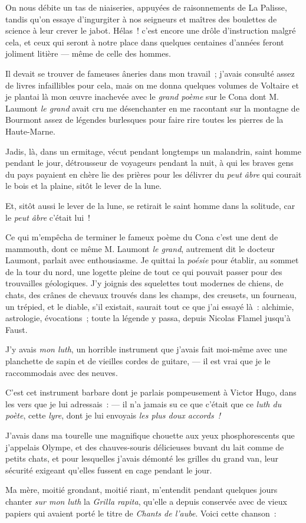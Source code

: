 \documentclass[french,twoside]{book} %
\begin{document}
On nous débite un tas de niaiseries, appuyées de raisonnements de La Palisse, tandis qu’on  essaye d’ingurgiter à nos seigneurs et maîtres des boulettes de science à leur crever le jabot. Hélas ! c’est encore une drôle d’instruction malgré cela, et ceux qui seront à notre place dans quelques centaines d’années feront joliment litière — même de celle des hommes.\par
Il devait se trouver de fameuses âneries dans mon travail ; j’avais consulté assez de livres infaillibles pour cela, mais on me donna quelques volumes de Voltaire et je plantai là mon œuvre inachevée avec le \emph{grand poème} sur le Cona dont M. Laumont \emph{le grand} avait cru me désenchanter en me racontant sur la montagne de Bourmont assez de légendes burlesques pour faire rire toutes les pierres de la Haute-Marne.\par
Jadis, là, dans un ermitage, vécut pendant longtemps un malandrin, saint homme pendant le jour, détrousseur de voyageurs pendant la nuit, à qui les braves gens du pays payaient en chère lie des prières pour les délivrer du \emph{peut âbre} qui courait le bois et la plaine, sitôt le lever de la lune.\par
Et, sitôt aussi le lever de la lune, se retirait le saint homme dans la solitude, car le \emph{peut âbre} c’était lui !\par
Ce qui m’empêcha de terminer le fameux poème du Cona c’est une dent de mammouth, dont ce  même M. Laumont \emph{le grand}, autrement dit le docteur Laumont, parlait avec enthousiasme. Je quittai la \emph{poésie} pour établir, au sommet de la tour du nord, une logette pleine de tout ce qui pouvait passer pour des trouvailles géologiques. J’y joignis des squelettes tout modernes de chiens, de chats, des crânes de chevaux trouvés dans les champs, des creusets, un fourneau, un trépied, et le diable, s’il existait, saurait tout ce que j’ai essayé là : alchimie, astrologie, évocations ; toute la légende y passa, depuis Nicolas Flamel jusqu’à Faust.\par
J’y avais \emph{mon luth}, un horrible instrument que j’avais fait moi-même avec une planchette de sapin et de vieilles cordes de guitare, — il est vrai que je le raccommodais avec des neuves.\par
C’est cet instrument barbare dont je parlais pompeusement à Victor Hugo, dans les vers que je lui adressais : — il n’a jamais su ce que c’était que ce \emph{luth du poète}, cette \emph{lyre}, dont je lui envoyais \emph{les plus doux accords !}\par
J’avais dans ma tourelle une magnifique chouette aux yeux phosphorescents que j’appelais Olympe, et des chauves-souris délicieuses buvant du lait comme de petits chats, et pour lesquelles j’avais démonté les grilles du grand  van, leur sécurité exigeant qu’elles fussent en cage pendant le jour.\par
Ma mère, moitié grondant, moitié riant, m’entendit pendant quelques jours chanter \emph{sur mon luth} la \emph{Grilla rapita}, qu’elle a depuis conservée avec de vieux papiers qui avaient porté le titre de \emph{Chants de l’aube}. Voici cette chanson :\par
\end{document}
